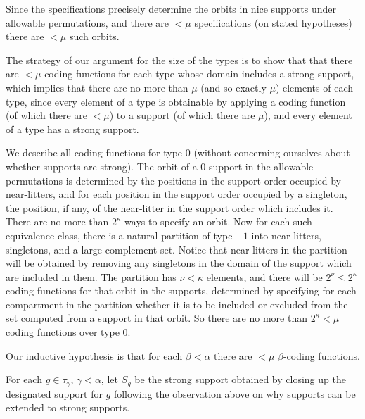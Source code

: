 \documentclass[112pt]{article}
\begin{document}
Since the specifications precisely determine the orbits in nice supports under allowable permutations, and there are $<\mu$ specifications
(on stated hypotheses) there are $<\mu$ such orbits.

The strategy of our argument for the size of the types is to show that that there are $<\mu$ coding functions for each type whose domain includes a strong support, which implies that there are no more than $\mu$ (and so exactly $\mu$) elements of each type, since every element of a type is obtainable by applying a coding function (of which there are $<\mu$) to a support (of which there are $\mu$), and every element of a type has a strong support.

\begin{description}

\item[Analysis of coding functions for type 0:]  We describe all coding functions for type 0 (without concerning ourselves about whether supports are strong).  The orbit of a 0-support in the allowable permutations is determined by the positions in the support order occupied by near-litters, and for each position in the support order occupied by a singleton, the position, if any, of the near-litter in the support order which includes it.  There are no more than $2^\kappa$ ways to specify an orbit.  Now for each such equivalence class, there is a natural partition of type $-1$ into near-litters, singletons, and a large complement set.  Notice that near-litters in the partition will be obtained by removing any singletons in the domain of the support which are included in them.  The partition has $\nu<\kappa$ elements, and there will be $2^\nu\leq 2^\kappa$ coding functions for that orbit in the supports, determined by specifying for each compartment in the partition whether it is to be included or excluded from the set computed from a support in that orbit.  So there are no more than $2^\kappa<\mu$ coding functions over type 0.

\item[Analysis of the general case:]  

\item
Our inductive hypothesis is that for each $\beta<\alpha$ there are $<\mu$ $\beta$-coding functions.

For each $g \in \tau_\gamma$, $\gamma<\alpha$, let $S_g$ be the strong support obtained by closing up the designated support for $g$ following the observation above on why supports can be extended to strong supports.


\end{description}
\end{document}
